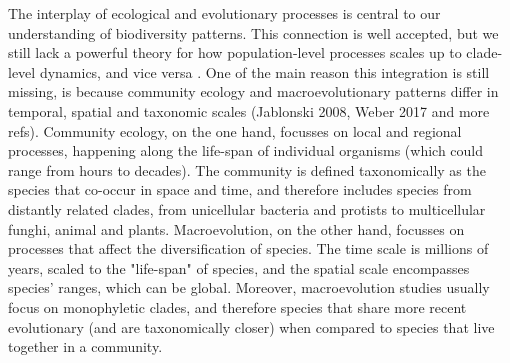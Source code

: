 







The interplay of ecological and evolutionary processes is central to our understanding of biodiversity patterns.
This connection is well accepted, but we still lack a powerful theory for how population-level processes scales up to clade-level dynamics, and vice versa \citep{jablonski2008biotic, weber2017evolution}.
One of the main reason this integration is still missing, is because community ecology and macroevolutionary patterns differ in temporal, spatial and taxonomic scales (Jablonski 2008, Weber 2017 and more refs). 
Community ecology, on the one hand, focusses on local and regional processes, happening along the life-span of individual organisms (which could range from hours to decades). The community is defined taxonomically as the species that co-occur in space and time, and therefore includes species from distantly related clades, from unicellular bacteria and protists to multicellular funghi, animal and plants. 
Macroevolution, on the other hand, focusses on processes that affect the diversification of species. The time scale is millions of years, scaled to the "life-span" of species, and the spatial scale encompasses species' ranges, which can be global. Moreover, macroevolution studies usually focus on monophyletic clades, and therefore species that share more recent evolutionary (and are taxonomically closer) when compared to species that live together in a community. 



